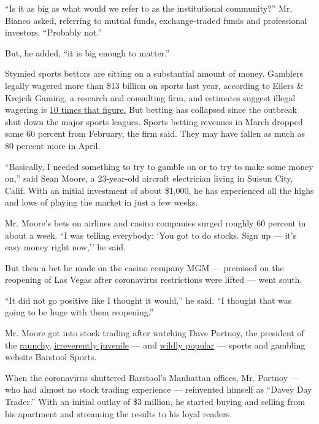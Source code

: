 ``Is it as big as what would we refer to as the institutional
community?'' Mr. Bianco asked, referring to mutual funds,
exchange-traded funds and professional investors. ``Probably not.''

But, he added, ``it is big enough to matter.''

Stymied sports bettors are sitting on a substantial amount of money.
Gamblers legally wagered more than \$13 billion on sports last year,
according to Eilers \& Krejcik Gaming, a research and consulting firm,
and estimates suggest illegal wagering is
\href{https://www.nytimes3xbfgragh.onion/2018/05/14/us/politics/supreme-court-sports-betting-new-jersey.html}{10
times that figure.} But betting has collapsed since the outbreak shut
down the major sports leagues. Sports betting revenues in March dropped
some 60 percent from February, the firm said. They may have fallen as
much as 80 percent more in April.

``Basically, I needed something to try to gamble on or to try to make
some money on,'' said Sean Moore, a 23-year-old aircraft electrician
living in Suisun City, Calif. With an initial investment of about
\$1,000, he has experienced all the highs and lows of playing the market
in just a few weeks.

Mr. Moore's bets on airlines and casino companies surged roughly 60
percent in about a week. ``I was telling everybody: `You got to do
stocks. Sign up --- it's easy money right now,'' he said.

But then a bet he made on the casino company MGM --- premised on the
reopening of Las Vegas after coronavirus restrictions were lifted ---
went south.

``It did not go positive like I thought it would,'' he said. ``I thought
that was going to be huge with them reopening.''

Mr. Moore got into stock trading after watching Dave Portnoy, the
president of the
\href{https://www.nytimes3xbfgragh.onion/2020/05/19/style/call-her-daddy-podcast.html}{raunchy},
\href{https://www.nytimes3xbfgragh.onion/2017/10/23/sports/espn-barstool-van-talk.html}{irreverently
juvenile} --- and
\href{https://www.nytimes3xbfgragh.onion/2017/11/14/magazine/spurned-by-espn-barstool-sports-is-staying-on-offense.html}{wildly
popular} --- sports and gambling website Barstool Sports.

When the coronavirus shuttered Barstool's Manhattan offices, Mr. Portnoy
--- who had almost no stock trading experience --- reinvented himself as
``Davey Day Trader.'' With an initial outlay of \$3 million, he started
buying and selling from his apartment and streaming the results to his
loyal readers.

